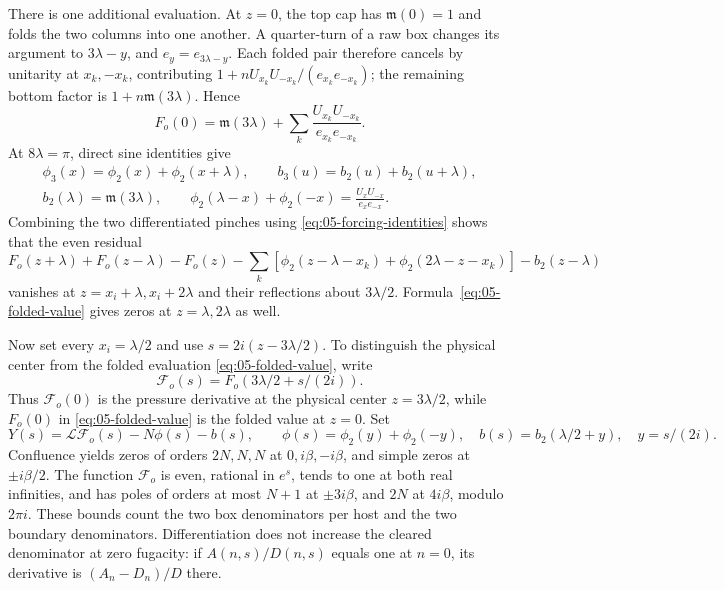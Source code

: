 There is one additional evaluation. At \(z=0\), the top cap has \(\mathfrak m(0)=1\) and folds the two columns into one another. A quarter-turn of a raw box changes its argument to \(3\lambda-y\), and \(e_y=e_{3\lambda-y}\). Each folded pair therefore cancels by unitarity at \(x_k,-x_k\), contributing
\(1+nU_{x_k}U_{-x_k}/(e_{x_k}e_{-x_k})\); the remaining bottom factor is \(1+n\mathfrak m(3\lambda)\). Hence
\begin{equation}
 F_o(0)=\mathfrak m(3\lambda)
            +\sum_k\frac{U_{x_k}U_{-x_k}}{e_{x_k}e_{-x_k}}.
 \label{eq:05-folded-value}
\end{equation}
At \(8\lambda=\pi\), direct sine identities give
\begin{equation}
 \begin{gathered}
 \phi_3(x)=\phi_2(x)+\phi_2(x+\lambda),\qquad
 b_3(u)=b_2(u)+b_2(u+\lambda),\\
 b_2(\lambda)=\mathfrak m(3\lambda),\qquad
 \phi_2(\lambda-x)+\phi_2(-x)
       =\frac{U_xU_{-x}}{e_xe_{-x}}.
 \end{gathered}
 \label{eq:05-forcing-identities}
\end{equation}
Combining the two differentiated pinches using \eqref{eq:05-forcing-identities} shows that the even residual
\[
 F_o(z+\lambda)+F_o(z-\lambda)-F_o(z)
 -\sum_k[\phi_2(z-\lambda-x_k)+\phi_2(2\lambda-z-x_k)]
 -b_2(z-\lambda)
\]
vanishes at \(z=x_i+\lambda,x_i+2\lambda\) and their reflections about \(3\lambda/2\). Formula~\eqref{eq:05-folded-value} gives zeros at \(z=\lambda,2\lambda\) as well.

Now set every \(x_i=\lambda/2\) and use \(s=2i(z-3\lambda/2)\). To distinguish the physical center from the folded evaluation
\eqref{eq:05-folded-value}, write
\[
 \mathcal F_o(s)=F_o(3\lambda/2+s/(2i)).
\]
Thus \(\mathcal F_o(0)\) is the pressure derivative at the physical
center \(z=3\lambda/2\), while \(F_o(0)\) in
\eqref{eq:05-folded-value} is the folded value at \(z=0\). Set
\begin{equation}
 Y(s)=\mathscr L\mathcal F_o(s)-N\phi(s)-b(s),\qquad
 \phi(s)=\phi_2(y)+\phi_2(-y),\quad
 b(s)=b_2(\lambda/2+y),\quad y=s/(2i).
 \label{eq:05-open-residual}
\end{equation}
Confluence yields zeros of orders \(2N,N,N\) at \(0,i\beta,-i\beta\), and simple zeros at \(\pm i\beta/2\). The function \(\mathcal F_o\) is even, rational in \(e^s\), tends to one at both real infinities, and has poles of orders at most \(N+1\) at \(\pm3i\beta\), and \(2N\) at \(4i\beta\), modulo \(2\pi i\). These bounds count the two box denominators per host and the two boundary denominators. Differentiation does not increase the cleared denominator at zero fugacity: if \(A(n,s)/D(n,s)\) equals one at \(n=0\), its derivative is \((A_n-D_n)/D\) there.


